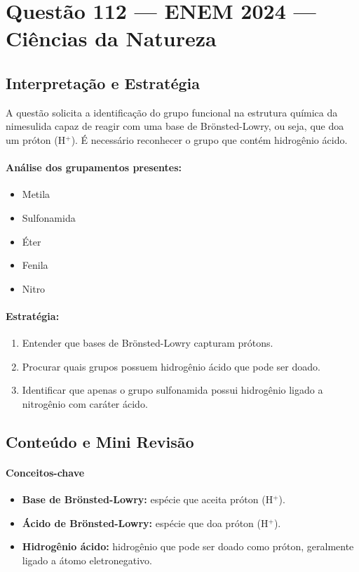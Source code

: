 \documentclass{article}
\begin{document}
\section*{Questão 112 — ENEM 2024 — Ciências da Natureza}

\subsection*{Interpretação e Estratégia}

A questão solicita a identificação do grupo funcional na estrutura química da nimesulida capaz de reagir com uma base de Brönsted-Lowry, ou seja, que doa um próton (H$^{+}$). É necessário reconhecer o grupo que contém hidrogênio ácido.

\paragraph{Análise dos grupamentos presentes:}
\begin{itemize}
  \item Metila
  \item Sulfonamida
  \item Éter
  \item Fenila
  \item Nitro
\end{itemize}

\paragraph{Estratégia:}
\begin{enumerate}
  \item Entender que bases de Brönsted-Lowry capturam prótons.
  \item Procurar quais grupos possuem hidrogênio ácido que pode ser doado.
  \item Identificar que apenas o grupo sulfonamida possui hidrogênio ligado a nitrogênio com caráter ácido.
\end{enumerate}

\subsection*{Conteúdo e Mini Revisão}

\paragraph{Conceitos-chave}
\begin{itemize}
  \item \textbf{Base de Brönsted-Lowry:} espécie que aceita próton (H$^{+}$).
  \item \textbf{Ácido de Brönsted-Lowry:} espécie que doa próton (H$^{+}$).
  \item \textbf{Hidrogênio ácido:} hidrogênio que pode ser doado como próton, geralmente ligado a átomo eletronegativo.
\end{itemize}
\end{document}
